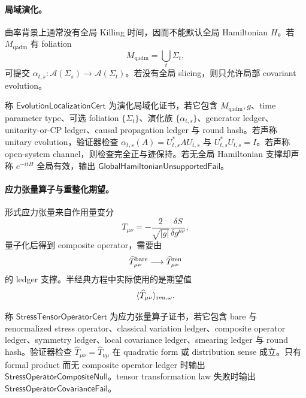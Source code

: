 \paragraph{局域演化。}
曲率背景上通常没有全局 Killing 时间，因而不能默认全局 Hamiltonian \(H\)。若 \(M_{\mathrm{qadm}}\) 有 foliation
\[
M_{\mathrm{qadm}}=\bigcup_t\Sigma_t,
\]
可提交 \(\alpha_{t,s}:\mathcal A(\Sigma_s)\to\mathcal A(\Sigma_t)\)。若没有全局 slicing，则只允许局部 covariant evolution。

\begin{definition}[演化局域化证书]\label{def:typed-address-biaxial-completion-evolution-localization-cert}
称 \(\mathsf{EvolutionLocalizationCert}\) 为演化局域化证书，若它包含 \(M_{\mathrm{qadm}},g\)、time parameter type、可选 foliation \(\{\Sigma_t\}\)、演化族 \(\{\alpha_{t,s}\}\)、generator ledger、unitarity-or-CP ledger、causal propagation ledger 与 round hash。若声称 unitary evolution，验证器检查 \(\alpha_{t,s}(A)=U_{t,s}^*AU_{t,s}\) 与 \(U_{t,s}^*U_{t,s}=I\)。若声称 open-system channel，则检查完全正与迹保持。若无全局 Hamiltonian 支撑却声称 \(e^{-itH}\) 全局有效，输出 \(\mathsf{GlobalHamiltonianUnsupportedFail}\)。
\end{definition}

\paragraph{应力张量算子与重整化期望。}
形式应力张量来自作用量变分
\[
T_{\mu\nu}
=
-\frac{2}{\sqrt{|g|}}
\frac{\delta S}{\delta g^{\mu\nu}},
\]
量子化后得到 composite operator，需要由
\[
\widehat T_{\mu\nu}^{\rm bare}
\longrightarrow
\widehat T_{\mu\nu}^{\rm ren}
\]
的 ledger 支撑。半经典方程中实际使用的是期望值
\[
\langle\widehat T_{\mu\nu}\rangle_{\rm ren,\omega}.
\]

\begin{definition}[应力张量算子证书]\label{def:typed-address-biaxial-completion-stress-tensor-operator-cert}
称 \(\mathsf{StressTensorOperatorCert}\) 为应力张量算子证书，若它包含 bare 与 renormalized stress operator、classical variation ledger、composite operator ledger、symmetry ledger、local covariance ledger、smearing ledger 与 round hash。验证器检查 \(\widehat T_{\mu\nu}=\widehat T_{\nu\mu}\) 在 quadratic form 或 distribution sense 成立。只有 formal product 而无 composite operator ledger 时输出 \(\mathsf{StressOperatorCompositeNull}\)。tensor transformation law 失败时输出 \(\mathsf{StressOperatorCovarianceFail}\)。
\end{definition}

